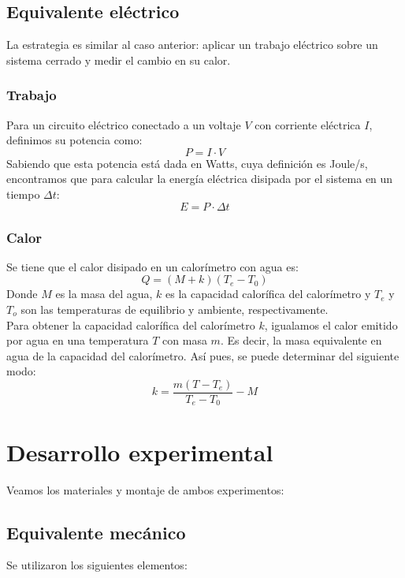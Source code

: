 \documentclass{article}
\begin{document}
\subsection{Equivalente eléctrico}
La estrategia es similar al caso anterior: aplicar un trabajo eléctrico sobre un sistema cerrado y medir el cambio en su calor.

\subsubsection{Trabajo}
Para un circuito eléctrico conectado a un voltaje $V$ con corriente eléctrica $I$, definimos su potencia como\cite{purcell}:
\begin{equation}
    P=I\cdot V
\end{equation}
Sabiendo que esta potencia está dada en Watts, cuya definición es Joule/s, encontramos que para calcular la energía eléctrica disipada por el sistema en un tiempo $\Delta t$:
\begin{equation}
    E=P\cdot\Delta t \label{energia}
\end{equation}

\subsubsection{Calor}
Se tiene que el calor disipado en un calorímetro con agua es:
\begin{equation}
    Q=(M+k)(T_e - T_0) \label{calor}
\end{equation}
Donde $M$ es la masa del agua, $k$ es la capacidad calorífica del calorímetro y $T_e$ y $T_o$ son las temperaturas de equilibrio y ambiente, respectivamente.\\

Para obtener la capacidad calorífica del calorímetro $k$, igualamos el calor emitido por agua en una temperatura $T$ con masa $m$. Es decir, la masa equivalente en agua de la capacidad del calorímetro. Así pues, se puede determinar del siguiente modo\cite{scehu}:
\begin{equation}
    k = \frac{m(T - T_e)}{T_e - T_0} - M
    \label{keq}
\end{equation}

\section{Desarrollo experimental}
Veamos los materiales y montaje de ambos experimentos:

\subsection{Equivalente mecánico}
Se utilizaron los siguientes elementos: 
\end{document}
